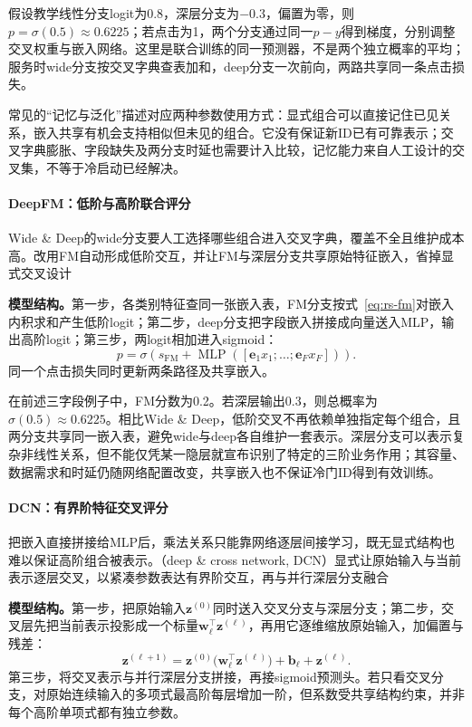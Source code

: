 假设教学线性分支logit为0.8，深层分支为$-0.3$，偏置为零，则$p=\sigma(0.5)\approx0.6225$；若点击为1，两个分支通过同一$p-y$得到梯度，分别调整交叉权重与嵌入网络。这里是联合训练的同一预测器，不是两个独立概率的平均；服务时wide分支按交叉字典查表加和，deep分支一次前向，两路共享同一条点击损失。

常见的“记忆与泛化”描述对应两种参数使用方式：显式组合可以直接记住已见关系，嵌入共享有机会支持相似但未见的组合。它没有保证新ID已有可靠表示；交叉字典膨胀、字段缺失及两分支时延也需要计入比较，记忆能力来自人工设计的交叉集，不等于冷启动已经解决。

\paragraph{DeepFM：低阶与高阶联合评分}
\label{sec:rs-deepfm}

Wide \& Deep的wide分支要人工选择哪些组合进入交叉字典，覆盖不全且维护成本高。改用FM自动形成低阶交互，并让FM与深层分支共享原始特征嵌入，省掉显式交叉设计

\textbf{模型结构。}第一步，各类别特征查同一张嵌入表，FM分支按式~\eqref{eq:rs-fm}对嵌入内积求和产生低阶logit；第二步，deep分支把字段嵌入拼接成向量送入MLP，输出高阶logit；第三步，两logit相加进入sigmoid：
\[
 p=\sigma\!\left(s_{\mathrm{FM}}+
       \operatorname{MLP}([\bm e_1x_1;\ldots;\bm e_Fx_F])\right).
\]
同一个点击损失同时更新两条路径及共享嵌入。

在前述三字段例子中，FM分数为0.2。若深层输出0.3，则总概率为$\sigma(0.5)\approx0.6225$。相比Wide \& Deep，低阶交叉不再依赖单独指定每个组合，且两分支共享同一嵌入表，避免wide与deep各自维护一套表示。深层分支可以表示复杂非线性关系，但不能仅凭某一隐层就宣布识别了特定的三阶业务作用；其容量、数据需求和时延仍随网络配置改变，共享嵌入也不保证冷门ID得到有效训练。

\paragraph{DCN：有界阶特征交叉评分}
\label{sec:rs-dcn}

把嵌入直接拼接给MLP后，乘法关系只能靠网络逐层间接学习，既无显式结构也难以保证高阶组合被表示。（deep \& cross network, DCN）显式让原始输入与当前表示逐层交叉，以紧凑参数表达有界阶交互，再与并行深层分支融合

\textbf{模型结构。}第一步，把原始输入$\bm z^{(0)}$同时送入交叉分支与深层分支；第二步，交叉层先把当前表示投影成一个标量$\bm w_\ell^\top\bm z^{(\ell)}$，再用它逐维缩放原始输入，加偏置与残差：
\begin{equation}
 \bm z^{(\ell+1)}
 =\bm z^{(0)}\bigl(\bm w_\ell^\top\bm z^{(\ell)}\bigr)
   +\bm b_\ell+\bm z^{(\ell)}.
 \label{eq:rs-dcn}
\end{equation}
第三步，将交叉表示与并行深层分支拼接，再接sigmoid预测头。若只看交叉分支，对原始连续输入的多项式最高阶每层增加一阶，但系数受共享结构约束，并非每个高阶单项式都有独立参数。

